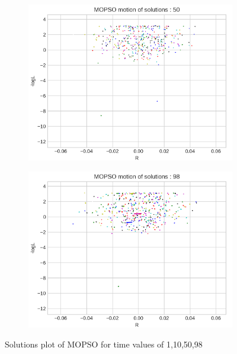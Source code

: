 \begin{figure}[H]
\begin{minipage}[b]{0.22\textwidth}
\begin{figure}[H]
  \end{figure}
  \end{minipage}
  \hspace{0.0cm}
  \begin{minipage}[b]{0.22\textwidth}
  \begin{figure}[H]
      \centering
      \includegraphics[width=\textwidth]{images/1-fix_axisMOPSO motion of solutions _ 50-R - logL-gard.png}
  \end{figure}
  \end{minipage}
  \hspace{0.0cm}
  \begin{minipage}[b]{0.22\textwidth}
  \begin{figure}[H]
      \centering
      \includegraphics[width=\textwidth]{images/1-fix_axisMOPSO motion of solutions _ 98-R - logL-gard.png}
  \end{figure}
  \end{minipage}

  \caption{Solutions plot of MOPSO for time values of  1,10,50,98}
  \label{fig:2x2group}
\end{figure}

